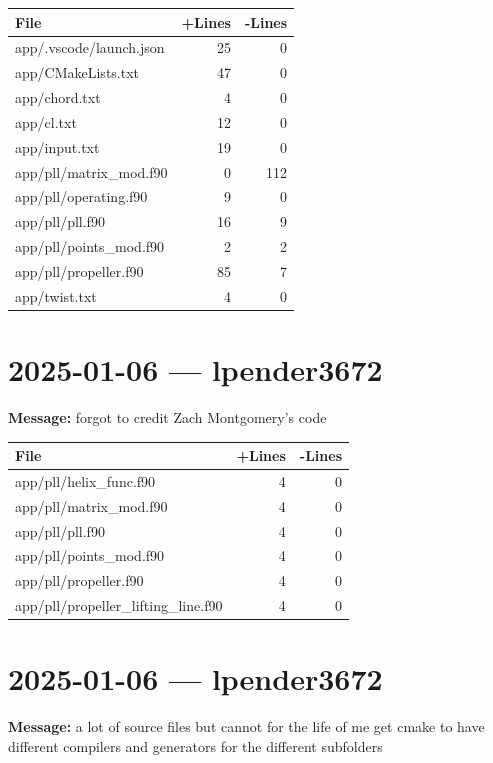 \documentclass{article}
\begin{document}
\begin{longtable}{|p{10cm}|r|r|}
\hline \textbf{File} & \textbf{+Lines} & \textbf{-Lines} \\
\hline
app/.vscode/launch.json & 25 & 0 \\
\hline
app/CMakeLists.txt & 47 & 0 \\
\hline
app/chord.txt & 4 & 0 \\
\hline
app/cl.txt & 12 & 0 \\
\hline
app/input.txt & 19 & 0 \\
\hline
app/pll/matrix\_mod.f90 & 0 & 112 \\
\hline
app/pll/operating.f90 & 9 & 0 \\
\hline
app/pll/pll.f90 & 16 & 9 \\
\hline
app/pll/points\_mod.f90 & 2 & 2 \\
\hline
app/pll/propeller.f90 & 85 & 7 \\
\hline
app/twist.txt & 4 & 0 \\
\hline
\end{longtable}

\section*{2025-01-06 --- lpender3672}
\textbf{Message:} forgot to credit Zach Montgomery's code

\begin{longtable}{|p{10cm}|r|r|}
\hline \textbf{File} & \textbf{+Lines} & \textbf{-Lines} \\
\hline
app/pll/helix\_func.f90 & 4 & 0 \\
\hline
app/pll/matrix\_mod.f90 & 4 & 0 \\
\hline
app/pll/pll.f90 & 4 & 0 \\
\hline
app/pll/points\_mod.f90 & 4 & 0 \\
\hline
app/pll/propeller.f90 & 4 & 0 \\
\hline
app/pll/propeller\_lifting\_line.f90 & 4 & 0 \\
\hline
\end{longtable}

\section*{2025-01-06 --- lpender3672}
\textbf{Message:} a lot of source files but cannot for the life of me get cmake to have different compilers and generators for the different subfolders
\end{document}
